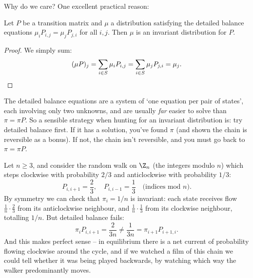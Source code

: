 \begin{center}
\end{center}

Why do we care? One excellent practical reason:

\begin{lemma}
	Let $P$ be a transition matrix and $\mu$ a distribution satisfying the detailed balance equations $\mu_i P_{i, j} = \mu_j P_{j, i}$ for all $i, j$. Then $\mu$ is an invariant distribution for $P$.
\end{lemma}
\begin{proof}
	We simply sum:
	$$
	(\mu P)_j = \sum_{i \in S} \mu_i P_{i, j} = \sum_{i \in S} \mu_j P_{j, i} = \mu_j. \qedhere
	$$
\end{proof}

The detailed balance equations are a system of `one equation per pair of states', each involving only two unknowns, and are usually \emph{far} easier to solve than $\pi = \pi P$. So a sensible strategy when hunting for an invariant distribution is: try detailed balance first. If it has a solution, you've found $\pi$ (and shown the chain is reversible as a bonus). If not, the chain isn't reversible, and you must go back to $\pi = \pi P$.

\begin{example}
	Let $n \geq 3$, and consider the random walk on $\Z_n$ (the integers modulo $n$) which steps clockwise with probability $2/3$ and anticlockwise with probability $1/3$:
	$$
	P_{i, i + 1} = \frac{2}{3}, \quad P_{i, i - 1} = \frac{1}{3} \quad \text{(indices mod } n).
	$$
	By symmetry we can check that $\pi_i = 1/n$ is invariant: each state receives flow $\frac{1}{n}\cdot\frac{2}{3}$ from its anticlockwise neighbour, and $\frac{1}{n} \cdot \frac{1}{3}$ from its clockwise neighbour, totalling $1/n$. But detailed balance fails:
	$$
	\pi_i P_{i, i + 1} = \frac{2}{3n} \neq \frac{1}{3n} = \pi_{i + 1}P_{i + 1, i}.
	$$
	And this makes perfect sense -- in equilibrium there is a net current of probability flowing clockwise around the cycle, and if we watched a film of this chain we could tell whether it was being played backwards, by watching which way the walker predominantly moves.
\end{example}

